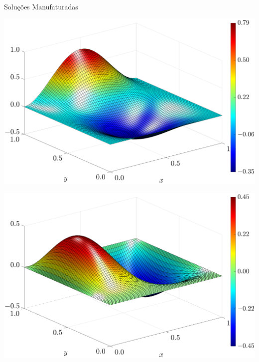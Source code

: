 \begin{frame}{Soluções Manufaturadas}
    \centering
    \captionsetup{justification=centering}
    \label{fig:sol_manufaturadas_1}
    \begin{minipage}{0.48\textwidth}
        \centering
        \includegraphics[width=\textwidth]{Figures/Exact_Surf_NormErr_2nd_Betann_0.1_Re_1_Wi_1_epsilon_0_xi_0_alphaG_0_Dt_1e-06_at_0.05_tipsim_1_MMS_12_U.eps}
        \label{fig_solexauCase1}
    \end{minipage}
    \hfill
    \begin{minipage}{0.48\textwidth}
        \centering
        \includegraphics[width=\textwidth]{Figures/Exact_Surf_NormErr_2nd_Betann_0.1_Re_1_Wi_1_epsilon_0_xi_0_alphaG_0_Dt_1e-06_at_0.05_tipsim_1_MMS_12_V.eps}
        \label{fig_solexavCase1}
    \end{minipage}
\end{frame}

